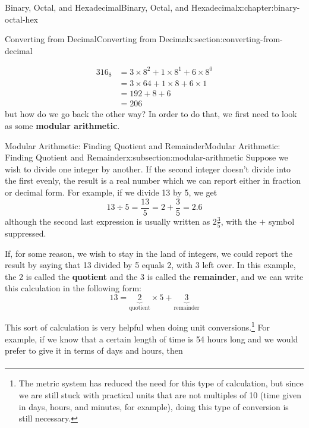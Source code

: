\documentclass[twoside,10pt,]{book}
\newcommand{\terminology}[1]{\textbf{#1}}
\numberwithin{equation}{section}
\newcommand{\amp}{&}
\begin{document}
\begin{chapterptx}{Binary, Octal, and Hexadecimal}{}{Binary, Octal, and Hexadecimal}{}{}{x:chapter:binary-octal-hex}
\begin{sectionptx}{Converting from Decimal}{}{Converting from Decimal}{}{}{x:section:converting-from-decimal}
\begin{introduction}{}
\begin{align*}
316_8 \amp = 3\times8^2+1\times8^1+6\times8^0\\
\amp = 3\times64+1\times8+6\times1\\
\amp = 192+8+6\\
\amp=206
\end{align*}
but how do we go back the other way?  In order to do that, we first need to look as some \terminology{modular arithmetic}.\end{introduction}%
%
%
\typeout{************************************************}
\typeout{************************************************}
%
\begin{subsectionptx}{Modular Arithmetic: Finding Quotient and Remainder}{}{Modular Arithmetic: Finding Quotient and Remainder}{}{}{x:subsection:modular-arithmetic}
Suppose we wish to divide one integer by another. If the second integer doesn't divide into the first evenly, the result is a real number which we can report either in fraction or decimal form.  For example, if we divide 13 by 5, we get%
\begin{equation*}
13\div 5=\frac{13}{5}=2+\frac{3}{5}=2.6
\end{equation*}
although the second last expression is usually written as \(2\frac{3}{5}\), with the \(+\) symbol suppressed.%
\par
If, for some reason, we wish to stay in the land of integers, we could report the result by saying that 13 divided by 5 equals 2, with 3 left over.  In this example, the 2 is called the \terminology{quotient} and the 3 is called the \terminology{remainder}, and we can write this calculation in the following form: %
\begin{equation*}
13=\underbrace{2}_{\text{quotient}}\times 5 + \underbrace{3}_{\text{remainder}}
\end{equation*}
%
\par
This sort of calculation is very helpful when doing unit conversions.\footnote{The metric system has reduced the need for this type of calculation, but since we are still stuck with practical units that are not multiples of 10 (time given in days, hours, and minutes, for example), doing this type of conversion is still necessary.\label{g:fn:idp226371800}}  For example, if we know that a certain length of time is 54 hours long and we would prefer to give it in terms of days and hours, then%
\begin{align*}

\end{align*}
\end{subsectionptx}
\end{sectionptx}
\end{chapterptx}
\end{document}
